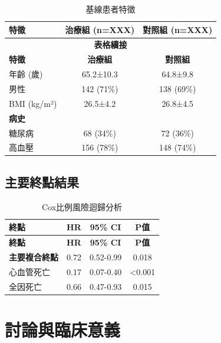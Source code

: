 \documentclass[12pt,a4paper]{article}
\begin{document}
\begin{longtable}{lcc}
\caption{基線患者特徵} \\
\toprule
\textbf{特徵} & \textbf{治療組 (n=XXX)} & \textbf{對照組 (n=XXX)} \\
\midrule
\endfirsthead

\multicolumn{3}{c}{\textbf{表格續接}} \\
\toprule
\textbf{特徵} & \textbf{治療組} & \textbf{對照組} \\
\midrule
\endhead

\bottomrule
\endfoot

年齡 (歲) & 65.2±10.3 & 64.8±9.8 \\
男性 & 142 (71\%) & 138 (69\%) \\
BMI (kg/m²) & 26.5±4.2 & 26.8±4.5 \\
\midrule
\multicolumn{3}{l}{\textbf{病史}} \\
糖尿病 & 68 (34\%) & 72 (36\%) \\
高血壓 & 156 (78\%) & 148 (74\%) \\
\bottomrule
\end{longtable}

\subsection{主要終點結果}

\begin{longtable}{p{5cm}ccc}
\caption{Cox比例風險迴歸分析} \\
\toprule
\textbf{終點} & \textbf{HR} & \textbf{95\% CI} & \textbf{P值} \\
\midrule
\endfirsthead

\toprule
\textbf{終點} & \textbf{HR} & \textbf{95\% CI} & \textbf{P值} \\
\midrule
\endhead

\bottomrule
\endfoot

\textbf{主要複合終點} & 0.72 & 0.52-0.99 & 0.018 \\
心血管死亡 & 0.17 & 0.07-0.40 & <0.001 \\
全因死亡 & 0.66 & 0.47-0.93 & 0.015 \\
\bottomrule
\end{longtable}

\section{討論與臨床意義}
\end{document}
